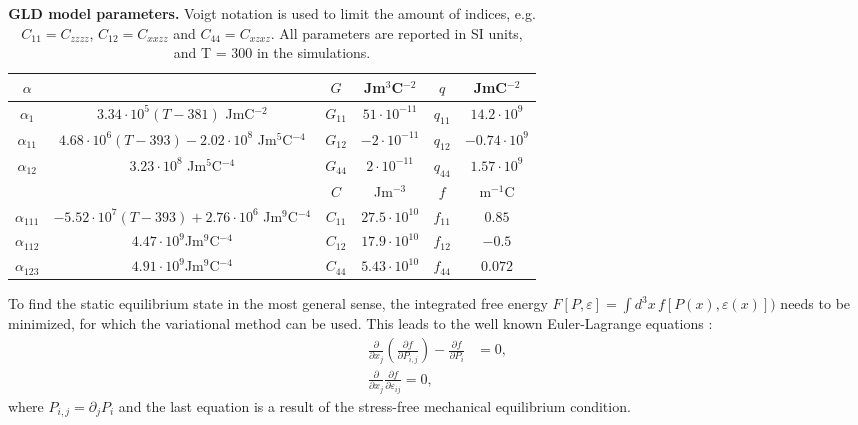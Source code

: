 \begin{table}
\begin{tabular}{|c|c|c|c|c|c|}
	\hline
	 $\alpha$ & & $G$ & Jm$^3$C$^{-2}$& $q$ & JmC$^{-2}$\\
	 \hline
	 $\alpha_1$ & $3.34\cdot 10^5 (T - 381)$  JmC$^{-2}$& $G_{11}$ & $51 \cdot 10^{-11}$ & $q_{11}$ & $14.2 \cdot 10^{9}$ \\
	 $\alpha_{11}$ & $4.68 \cdot 10^6 (T-393) - 2.02 \cdot 10^8$ Jm$^5$C$^{-4}$& $G_{12}$ & $-2 \cdot 10^{-11}$ & $q_{12}$ & $-0.74 \cdot 10^{9}$ \\
	 $\alpha_{12}$ & $3.23 \cdot 10^8$ Jm$^5$C$^{-4}$ & $G_{44}$ & $2 \cdot 10^{-11}$  & $q_{44}$ & $1.57 \cdot 10^{9}$ \\
	 \cline{3-6}
	 & & $C$ &Jm$^{-3}$ & $f$ & m$^{-1}$C\\
	 \cline{3-6}
	 $\alpha_{111}$ & $-5.52 \cdot 10^7 (T - 393) + 2.76 \cdot 10^6 $ Jm$^9$C$^{-4}$ & $C_{11}$ & $27.5 \cdot 10^{10}$ & $f_{11}$ & $0.85$ \\
	 $\alpha_{112}$ &  $4.47 \cdot 10^9 $Jm$^9$C$^{-4}$  & $C_{12}$ & $17.9 \cdot 10^{10}$ & $f_{12}$ & $-0.5$  \\
	 $\alpha_{123}$ & $4.91 \cdot 10^9$Jm$^9$C$^{-4}$  &$C_{44}$ & $5.43 \cdot 10^{10}$ & $f_{44}$ & $ 0.072$ \\
	 \hline
\end{tabular}
\caption{{\bf GLD model parameters.} Voigt notation \cite{Voigt} is used to limit the amount of indices, e.g. $C_{11} = C_{zzzz}$, $C_{12} = C_{xxzz}$ and $C_{44}= C_{xzxz}$.  All parameters are reported in SI units, and T = 300 in the simulations.\label{tab:BTO_param}}
\end{table}

To find the static equilibrium state in the most general sense, the integrated free energy $F[P,\varepsilon] = \int d^3x \,f[P(x), \varepsilon(x)])$ needs to be minimized, for which the variational method can be used.
This leads to the well known Euler-Lagrange equations \cite{Cao1991, Marton2010}:
\begin{align}
	\label{eq:BTO_euler}
	\frac{\partial}{\partial x_j}\left( \frac{\partial f}{\partial P_{i,j}}\right) - \frac{\partial f}{\partial P_i} &= 0, \\
	\frac{\partial}{\partial x_j}\frac{\partial f}{\partial \varepsilon_{ij}} = 0,
\end{align}
where $P_{i,j} = \partial_j P_i$ and the last equation is a result of the stress-free mechanical equilibrium condition.


